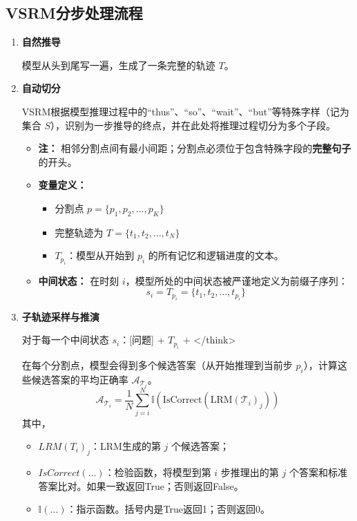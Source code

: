 \documentclass{article}
\begin{document}
\subsection{VSRM分步处理流程}
\begin{enumerate}
    \item \textbf{自然推导}
    
    模型从头到尾写一遍，生成了一条完整的轨迹 $T$。

    \item \textbf{自动切分}
    
    VSRM根据模型推理过程中的“thus”、“so”、“wait”、“but”等特殊字样（记为集合 $S$），识别为一步推导的终点，并在此处将推理过程切分为多个子段。
    
    \begin{itemize}
        \item \textbf{注：} 相邻分割点间有最小间距；分割点必须位于包含特殊字段的\textbf{完整句子}的开头。
        \item \textbf{变量定义：}
        \begin{itemize}
            \item 分割点 $p=\{p_1,p_2,\dots,p_K\}$
            \item 完整轨迹为 ${T} = \{t_1, t_2, \dots, t_N\}$
            \item $T_{p_i}$：模型从开始到 $p_i$ 的所有记忆和逻辑进度的文本。
        \end{itemize}
        \item \textbf{中间状态：} 在时刻 $i$，模型所处的中间状态被严谨地定义为前缀子序列：
        \[ s_i = {T}_{p_i} = \{t_1, t_2, \dots, t_{p_i}\} \]
    \end{itemize}

    \item \textbf{子轨迹采样与推演}
    
    对于每一个中间状态 $s_i$：[问题] + $T_{p_i}$ + </think> 
    
    在每个分割点，模型会得到多个候选答案（从开始推理到当前步 $p_i$），计算这些候选答案的平均正确率 $\mathcal{A}_{\mathcal{T}_i}$。
    \begin{equation}
        \mathcal{A}_{\mathcal{T}_i} = \frac{1}{N} \sum_{j=i}^{N} \mathbb{I}(\text{IsCorrect}(\text{LRM}(\mathcal{T}_i)_j))
    \end{equation}
    其中，
    \begin{itemize}
        \item $LRM(T_i)_j$：LRM生成的第 $j$ 个候选答案；
        \item $IsCorrect(\dots)$：检验函数，将模型到第 $i$ 步推理出的第 $j$ 个答案和标准答案比对。如果一致返回True；否则返回False。
        \item $\mathbb{I}(\dots)$：指示函数。括号内是True返回1；否则返回0。
    \end{itemize}


\end{enumerate}
\end{document}
